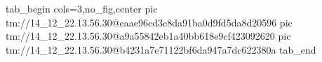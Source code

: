  
 
 
 
 

\qqSecOrig


\ifcmt
  tab_begin cols=3,no_fig,center
    pic tm://14_12_22.13.56.30@eaae96cd3c8da91ba0d9fd5da8d20596
    pic tm://14_12_22.13.56.30@a9a55842eb1a40bb618e9cf423092620
    pic tm://14_12_22.13.56.30@b4231a7e71122bf6da947a7dc622380a
  tab_end
\fi

